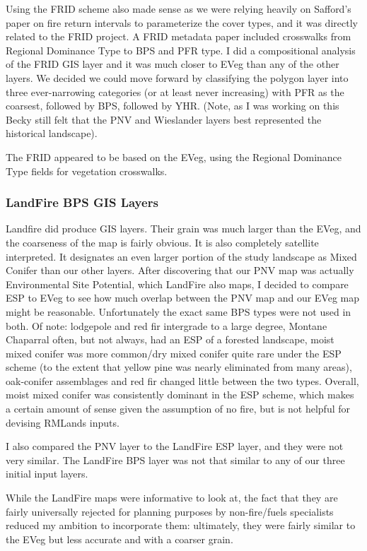 Using the FRID scheme also made sense as we were relying heavily on Safford's paper on fire return intervals to parameterize the cover types, and it was directly related to the FRID project. A FRID metadata paper included crosswalks from Regional Dominance Type to BPS and PFR type. I did a compositional analysis of the FRID GIS layer and it was much closer to EVeg than any of the other layers. We decided we could move forward by classifying the polygon layer into three ever-narrowing categories (or at least never increasing) with PFR as the coarsest, followed by BPS, followed by YHR. (Note, as I was working on this Becky still felt that the PNV and Wieslander layers best represented the historical landscape). 

The FRID appeared to be based on the EVeg, using the Regional Dominance Type fields for vegetation crosswalks.

\subsubsection{LandFire BPS GIS Layers}
Landfire did produce GIS layers. Their grain was much larger than the EVeg, and the coarseness of the map is fairly obvious. It is also completely satellite interpreted. It designates an even larger portion of the study landscape as Mixed Conifer than our other layers. After discovering that our PNV map was actually Environmental Site Potential, which LandFire also maps, I decided to compare ESP to EVeg to see how much overlap between the PNV map and our EVeg map might be reasonable. Unfortunately the exact same BPS types were not used in both. Of note: lodgepole and red fir intergrade to a large degree, Montane Chaparral often, but not always, had an ESP of a forested landscape, moist mixed conifer was more common/dry mixed conifer quite rare under the ESP scheme (to the extent that yellow pine was nearly eliminated from many areas), oak-conifer assemblages and red fir changed little between the two types. Overall, moist mixed conifer was consistently dominant in the ESP scheme, which makes a certain amount of sense given the assumption of no fire, but is not helpful for devising RMLands inputs. 

I also compared the PNV layer to the LandFire ESP layer, and they were not very similar. The LandFire BPS layer was not that similar to any of our three initial input layers.

While the LandFire maps were informative to look at, the fact that they are fairly universally rejected for planning purposes by non-fire/fuels specialists reduced my ambition to incorporate them: ultimately, they were fairly similar to the EVeg but less accurate and with a coarser grain.

